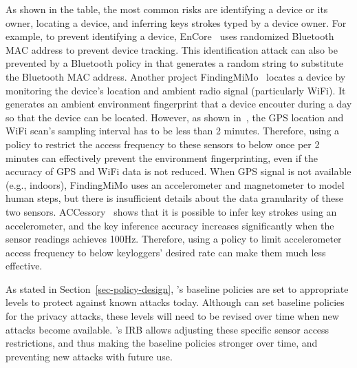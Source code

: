 As shown in the table, the most common risks are identifying a device or its 
owner, locating a device, and inferring keys strokes typed by a device owner. 
For example, to prevent identifying a device, EnCore~\cite{aditya2014encore} 
uses randomized Bluetooth MAC address to prevent device tracking. This 
identification attack can also be
prevented by a Bluetooth policy in \sysname that generates a random string to 
substitute the Bluetooth MAC address. Another project FindingMiMo~\cite{shin2011findingmimo} 
locates a device by monitoring the device's location and ambient radio signal 
(particularly WiFi). It generates an ambient environment fingerprint that a 
device encouter during a day so that the device can be located. However, as 
shown in~\cite{shin2011findingmimo}, the GPS location and WiFi scan's sampling 
interval has to be less than 2 minutes. Therefore, using a \sysname policy to 
restrict the access frequency to these sensors to below once per 2 minutes can 
effectively prevent the environment fingerprinting, even if the accuracy of GPS 
and WiFi data is not reduced. When GPS signal is not available (e.g., indoors), 
FindingMiMo uses an accelerometer and magnetometer to model human steps,
but there is insufficient details about the data granularity of these two sensors. 
ACCessory~\cite{owusu2012accessory} shows that it is possible to infer key 
strokes using an accelerometer, and the key inference accuracy increases 
significantly when the sensor readings achieves 100Hz. Therefore, using a 
policy to limit accelerometer access frequency to below keyloggers' desired 
rate can make them much less effective. 

As stated in Section~\ref{sec-policy-design}, \sysname's baseline policies are 
set to appropriate levels to protect against known attacks today. 
Although \sysname can set baseline policies for the privacy attacks, these 
levels will need to be revised over time when new attacks become available. 
\sysname's IRB allows adjusting these specific sensor access restrictions, 
and thus making the baseline policies stronger over time, and preventing new 
attacks with future use.

